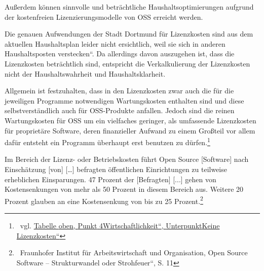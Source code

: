 \documentclass[a4paper]{article}
\newcommand\textstyleInternetlink[1]{\foreignlanguage{english}{\textcolor[rgb]{0.0,0.0,0.5019608}{#1}}}
\begin{document}
\bigskip

{
Au{\ss}erdem k\"onnen sinnvolle und betr\"achtliche
Haushaltsoptimierungen aufgrund der kostenfreien Lizenzierungsmodelle
von OSS erreicht werden.}

{
Die genauen Aufwendungen der Stadt Dortmund f\"ur Lizenzkosten sind aus
dem aktuellen Haushaltsplan leider nicht ersichtlich, weil sie sich in
anderen Haushaltsposten {\quotedblbase}verstecken{\textquotedblleft}.
Da allerdings davon auszugehen ist, dass die Lizenzkosten
betr\"achtlich sind, entspricht die Verkalkulierung der Lizenzkosten
nicht der Haushaltswahrheit und Haushaltsklarheit.}

{
Allgemein ist festzuhalten, dass in den Lizenzkosten zwar auch die f\"ur
die jeweiligen Programme notwendigen Wartungskosten enthalten sind und
diese selbstverst\"andlich auch f\"ur OSS-Produkte anfallen. Jedoch
sind die reinen Wartungskosten f\"ur OSS um ein vielfaches geringer,
als umfassende Lizenzkosten f\"ur propriet\"are Software, deren
finanzieller Aufwand zu einem Gro{\ss}teil vor allem daf\"ur entsteht
ein Programm \"uberhaupt erst benutzen zu d\"urfen.\footnote{\ vgl.
\hyperlink{KeineLizenzkosten}{\textstyleInternetlink{Tabelle}}\hyperlink{KeineLizenzkosten}{\textstyleInternetlink{
}}\hyperlink{KeineLizenzkosten}{\textstyleInternetlink{oben,}}\hyperlink{KeineLizenzkosten}{\textstyleInternetlink{
}}\hyperlink{KeineLizenzkosten}{\textstyleInternetlink{Punkt}}\hyperlink{KeineLizenzkosten}{\textstyleInternetlink{
}}\hyperlink{KeineLizenzkosten}{\textstyleInternetlink{4}}\hyperlink{KeineLizenzkosten}{\textstyleInternetlink{
{\quotedblbase}}}\hyperlink{KeineLizenzkosten}{\textstyleInternetlink{Wirtschaftlichkeit}}\hyperlink{KeineLizenzkosten}{\textstyleInternetlink{{\textquotedblleft}}}\hyperlink{KeineLizenzkosten}{\textstyleInternetlink{,}}\hyperlink{KeineLizenzkosten}{\textstyleInternetlink{
}}\hyperlink{KeineLizenzkosten}{\textstyleInternetlink{Unterpunkt}}\hyperlink{KeineLizenzkosten}{\textstyleInternetlink{
{\quotedblbase}}}\hyperlink{KeineLizenzkosten}{\textstyleInternetlink{Keine}}\hyperlink{KeineLizenzkosten}{\textstyleInternetlink{
}}\hyperlink{KeineLizenzkosten}{\textstyleInternetlink{Lizenzkosten}}\hyperlink{KeineLizenzkosten}{\textstyleInternetlink{{\textquotedblleft}}}}}

{
{\guillemotright}Im Bereich der Lizenz- oder Betriebskosten f\"uhrt Open
Source [Software] nach Einsch\"atzung [von] [{\dots}] befragten
\"offentlichen Einrichtungen zu teilweise erheblichen Einsparungen. 47
Prozent der [Befragten] [...] gehen von Kostensenkungen von mehr als 50
Prozent in diesem Bereich aus. Weitere 20 Prozent glauben an eine
Kostensenkung von bis zu 25
Prozent.{\guillemotleft}\footnote{\ Fraunhofer Institut f\"ur
Arbeitswirtschaft und Organisation, {\quotedblbase}Open Source Software
-- Strukturwandel oder Strohfeuer{\textquotedblleft}, S. 11}}
\end{document}
